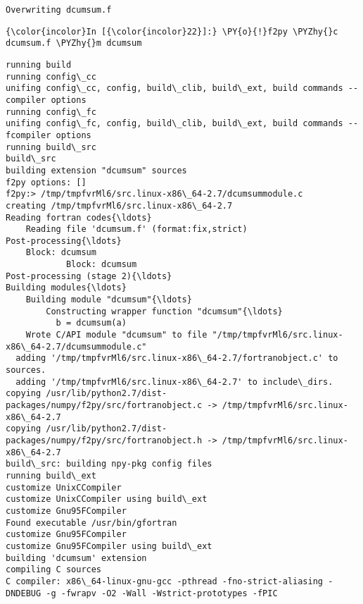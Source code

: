     \begin{Verbatim}[commandchars=\\\{\}]
Overwriting dcumsum.f

    \end{Verbatim}



    \begin{Verbatim}[commandchars=\\\{\}]
{\color{incolor}In [{\color{incolor}22}]:} \PY{o}{!}f2py \PYZhy{}c dcumsum.f \PYZhy{}m dcumsum
\end{Verbatim}

    \begin{Verbatim}[commandchars=\\\{\}]
running build
running config\_cc
unifing config\_cc, config, build\_clib, build\_ext, build commands --compiler options
running config\_fc
unifing config\_fc, config, build\_clib, build\_ext, build commands --fcompiler options
running build\_src
build\_src
building extension "dcumsum" sources
f2py options: []
f2py:> /tmp/tmpfvrMl6/src.linux-x86\_64-2.7/dcumsummodule.c
creating /tmp/tmpfvrMl6/src.linux-x86\_64-2.7
Reading fortran codes{\ldots}
	Reading file 'dcumsum.f' (format:fix,strict)
Post-processing{\ldots}
	Block: dcumsum
			Block: dcumsum
Post-processing (stage 2){\ldots}
Building modules{\ldots}
	Building module "dcumsum"{\ldots}
		Constructing wrapper function "dcumsum"{\ldots}
		  b = dcumsum(a)
	Wrote C/API module "dcumsum" to file "/tmp/tmpfvrMl6/src.linux-x86\_64-2.7/dcumsummodule.c"
  adding '/tmp/tmpfvrMl6/src.linux-x86\_64-2.7/fortranobject.c' to sources.
  adding '/tmp/tmpfvrMl6/src.linux-x86\_64-2.7' to include\_dirs.
copying /usr/lib/python2.7/dist-packages/numpy/f2py/src/fortranobject.c -> /tmp/tmpfvrMl6/src.linux-x86\_64-2.7
copying /usr/lib/python2.7/dist-packages/numpy/f2py/src/fortranobject.h -> /tmp/tmpfvrMl6/src.linux-x86\_64-2.7
build\_src: building npy-pkg config files
running build\_ext
customize UnixCCompiler
customize UnixCCompiler using build\_ext
customize Gnu95FCompiler
Found executable /usr/bin/gfortran
customize Gnu95FCompiler
customize Gnu95FCompiler using build\_ext
building 'dcumsum' extension
compiling C sources
C compiler: x86\_64-linux-gnu-gcc -pthread -fno-strict-aliasing -DNDEBUG -g -fwrapv -O2 -Wall -Wstrict-prototypes -fPIC


\end{Verbatim}
